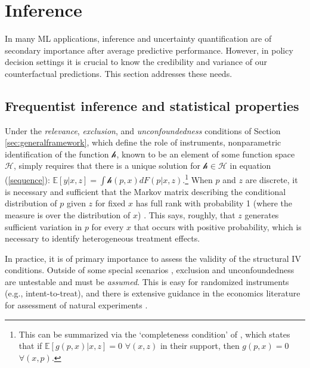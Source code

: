 \documentclass[12pt]{article}
\newcommand{\mc}[1]{\mathcal{#1}}
\newcommand{\ds}[1]{\mathds{#1}}
\newcommand{\cf}{\ensuremath{\mathscr{h}}}
\begin{document}
\section{Inference}
\label{sec:inference}

In many ML applications, inference and uncertainty quantification  are of secondary importance after average predictive performance.  However, in policy decision settings it is crucial to know the credibility and variance of our counterfactual predictions.  This section addresses these needs.

\subsection{Frequentist inference and statistical properties}

Under the {\it relevance}, {\it exclusion}, and {\it unconfoundedness}  conditions of Section \ref{sec:generalframework}, which define the role of instruments,  nonparametric identification of the function $\cf$, known to be an element of some function space $\mc{H}$, simply requires that there is a unique solution for $\cf \in \mc{H}$ in   equation (\ref{sequence}): $\ds{E}[y|x,z] = \int \cf(p,x)dF(p|x,z)$.\footnote{This can be summarized via the `completeness condition' of \cite{newey2003instrumental}, which states that if  $\ds{E}[g(p,x)|x,z] = 0$ $\forall (x,z)$ in their support, then $g(p,x)=0$ $\forall (x,p)$.} 
When $p$ and $z$ are discrete, it is necessary and sufficient that the Markov matrix describing the conditional distribution of $p$ given $z$ for fixed $x$ has full rank with probability 1 (where the measure is over the distribution of $x$) \citep{newey2003instrumental}.
This says, roughly, that $z$ generates sufficient variation in $p$ for every $x$ that occurs with positive probability, which is necessary to identify heterogeneous treatment effects.

In practice, it is of primary importance to assess the validity of the structural IV conditions.  Outside of some special scenarios \citep{pearl1995testability}, exclusion and unconfoundedness are untestable and must  be {\it assumed}.  This is easy for randomized instruments (e.g.,  intent-to-treat), and there is extensive guidance in the economics literature for assessment of natural experiments \citep[see][for an introduction]{angrist2008mostly}.
\end{document}
